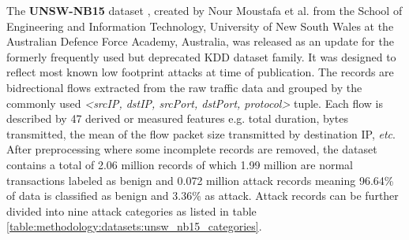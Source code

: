 The \textbf{UNSW-NB15} dataset \cite{unsw_nb15}, created by Nour Moustafa et al. from the School of Engineering and Information Technology, University of New South Wales at the Australian Defence Force Academy, Australia, was released as an update for the formerly frequently used but deprecated \cite{unsw_nb15} KDD dataset family. It was designed to reflect most known low footprint attacks at time of publication. The records are bidrectional flows extracted from the raw traffic data and grouped by the commonly used \textit{<srcIP, dstIP, srcPort, dstPort, protocol>} tuple. Each flow is described by 47 derived or measured features e.g. total duration, bytes transmitted, the mean of the flow packet size transmitted by destination IP, \textit{etc}. After preprocessing where some incomplete records are removed, the dataset contains a total of 2.06 million records of which 1.99 million are normal transactions labeled as benign and 0.072 million attack records meaning 96.64\% of data is classified as benign and 3.36\% as attack. Attack records can be further divided into nine attack categories as listed in table \ref{table:methodology:datasets:unsw_nb15_categories}.

